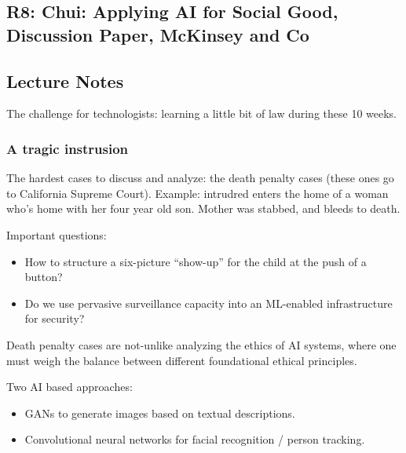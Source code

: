 \documentclass{article}
\begin{document}
\subsection{R8: Chui: Applying AI for Social Good, Discussion Paper, McKinsey and Co}

\subsection{Lecture Notes}

The challenge for technologists: learning a little bit of law during these 10 weeks.

\subsubsection{A tragic instrusion}

The hardest cases to discuss and analyze: the death penalty cases (these ones go to California Supreme Court).  Example: intrudred enters the home of a woman who's home with her four year old son.  Mother was stabbed, and bleeds to death.

Important questions:

\begin{itemize}
  \item How to structure a six-picture ``show-up'' for the child at the push of a button?
  \item Do we use pervasive surveillance capacity into an ML-enabled infrastructure for security?
\end{itemize}

Death penalty cases are not-unlike analyzing the ethics of AI systems, where one must weigh the balance between different foundational ethical principles.

Two AI based approaches:
\begin{itemize}
  \item GANs to generate images based on textual descriptions.
  \item Convolutional neural networks for facial recognition / person tracking. 
\end{itemize}
\end{document}
